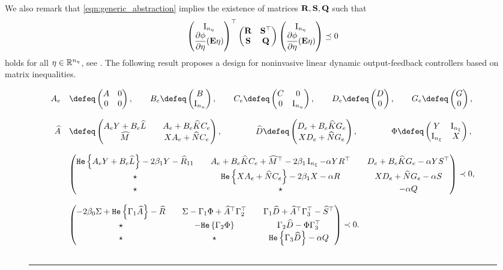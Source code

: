 \documentclass{ifacconf}
\begin{document}
We also remark that \eqref{eqn:generic_abstraction} implies the existence of matrices ${\bf{R}},{\bf{S}},{\bf{Q}}$ such that
\begin{equation}\label{eqn:generic_abstraction_ctrl}
    \left(\begin{matrix}\operatorname{I}_{n_\eta}\\\dfrac{\partial \phi}{\partial \eta}({\bf{E}}\eta)\end{matrix}\right)^\top\left(\begin{matrix}{\bf{R}}&{\bf{S}}^\top\\{\bf{S}}&{\bf{Q}}\end{matrix}\right)\left(\begin{matrix}\operatorname{I}_{n_\eta}\\\dfrac{\partial \phi}{\partial \eta}({\bf{E}}\eta)\end{matrix}\right)\preceq 0
\end{equation}
holds for all $\eta\in{\mathbb{R}}^{n_\eta}$, see \citep[Section 2.5]{zoboli2024dynamic}. 
The following result proposes a design for noninvasive linear dynamic output-feedback controllers based on matrix inequalities.
\begin{figure*}
    \begin{equation}\label{eqn:2_contraction_BMI}
    \begin{array}{rl}
      A_e&\defeq \pmx{A&0\\0&0},\qquad  B_e \defeq \pmx{B\\\Id_{n_u}},\qquad C_e \defeq \pmx{C&0\\0&\Id_{n_u}},\qquad 
    D_e \defeq  \pmx{D\\0}, \qquad G_e \defeq  \pmx{G\\0},
     \\&\\
        \widehat A &\defeq\pmx{A_eY+B_e \widehat L && A_e + B_e  \widehat K C_e \\ \widehat M && X A_e+ \widehat N  C_e }, \qquad \qquad  
        \widehat D \defeq \pmx{D_e +B_e \widehat K G_e\\ X D_e  + \widehat N G_e}, \qquad \qquad
        \Phi \defeq \pmx{Y & \Id_{n_\xi}\\ \Id_{n_\xi} & X},
        \\&\\
           & \pmx{
   \He{A_e Y+B_e \widehat L} -2\beta_1 Y - \widehat R_{11} && A_e+B_e \widehat K C_e  + \widehat M^\top-2\beta_1 \Id_{n_\xi} -  \alpha YR^\top && D_e +B_e \widehat K G_e -  \alpha YS^\top\\
   \star && \He{ X A_e +  \widehat N  C_e } -2\beta_1 X   -\alpha R&& X D_e  + \widehat N G_e -\alpha S\\
   \star &&\star&& - \alpha Q
    }\prec 0,\\&\\
         &\pmx{
    -2\beta_0 \Sigma+ \He{\Gamma_1 \widehat A} -  \widehat R & & \Sigma- \Gamma_1 \Phi+ \widehat A^\top \Gamma_2^\top  &  &\Gamma_1 \widehat D +  \widehat A^\top \Gamma_3^\top - \widehat S^\top\\
    \star  && -\He{\Gamma_2 \Phi}  & &\Gamma_2 \widehat D -\Phi\Gamma_3^\top \\
    \star && \star& &\He{\Gamma_3 \widehat D} - \alpha  Q
    }\prec 0  .\\&\\
    \end{array}    
    \end{equation}
    \hrule
\end{figure*}
\end{document}
